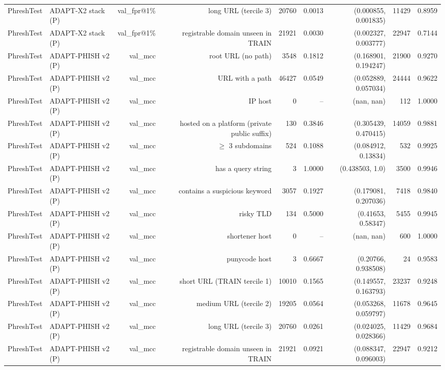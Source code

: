 \begin{table}[t]
\begin{tabular}{llrrrrrrr}
PhreshTest & ADAPT-X2 stack (P) & val\_fpr@1\% & long URL (tercile 3) & 20760 & 0.0013 & (0.000855, 0.001835) & 11429 & 0.8959 \\
PhreshTest & ADAPT-X2 stack (P) & val\_fpr@1\% & registrable domain unseen in TRAIN & 21921 & 0.0030 & (0.002327, 0.003777) & 22947 & 0.7144 \\
PhreshTest & ADAPT-PHISH v2 (P) & val\_mcc & root URL (no path) & 3548 & 0.1812 & (0.168901, 0.194247) & 21900 & 0.9270 \\
PhreshTest & ADAPT-PHISH v2 (P) & val\_mcc & URL with a path & 46427 & 0.0549 & (0.052889, 0.057034) & 24444 & 0.9622 \\
PhreshTest & ADAPT-PHISH v2 (P) & val\_mcc & IP host & 0 & -- & (nan, nan) & 112 & 1.0000 \\
PhreshTest & ADAPT-PHISH v2 (P) & val\_mcc & hosted on a platform (private public suffix) & 130 & 0.3846 & (0.305439, 0.470415) & 14059 & 0.9881 \\
PhreshTest & ADAPT-PHISH v2 (P) & val\_mcc & $\geq$ 3 subdomains & 524 & 0.1088 & (0.084912, 0.13834) & 532 & 0.9925 \\
PhreshTest & ADAPT-PHISH v2 (P) & val\_mcc & has a query string & 3 & 1.0000 & (0.438503, 1.0) & 3500 & 0.9946 \\
PhreshTest & ADAPT-PHISH v2 (P) & val\_mcc & contains a suspicious keyword & 3057 & 0.1927 & (0.179081, 0.207036) & 7418 & 0.9840 \\
PhreshTest & ADAPT-PHISH v2 (P) & val\_mcc & risky TLD & 134 & 0.5000 & (0.41653, 0.58347) & 5455 & 0.9945 \\
PhreshTest & ADAPT-PHISH v2 (P) & val\_mcc & shortener host & 0 & -- & (nan, nan) & 600 & 1.0000 \\
PhreshTest & ADAPT-PHISH v2 (P) & val\_mcc & punycode host & 3 & 0.6667 & (0.20766, 0.938508) & 24 & 0.9583 \\
PhreshTest & ADAPT-PHISH v2 (P) & val\_mcc & short URL (TRAIN tercile 1) & 10010 & 0.1565 & (0.149557, 0.163793) & 23237 & 0.9248 \\
PhreshTest & ADAPT-PHISH v2 (P) & val\_mcc & medium URL (tercile 2) & 19205 & 0.0564 & (0.053268, 0.059797) & 11678 & 0.9645 \\
PhreshTest & ADAPT-PHISH v2 (P) & val\_mcc & long URL (tercile 3) & 20760 & 0.0261 & (0.024025, 0.028366) & 11429 & 0.9684 \\
PhreshTest & ADAPT-PHISH v2 (P) & val\_mcc & registrable domain unseen in TRAIN & 21921 & 0.0921 & (0.088347, 0.096003) & 22947 & 0.9212 \\

\end{tabular}
\end{table}
